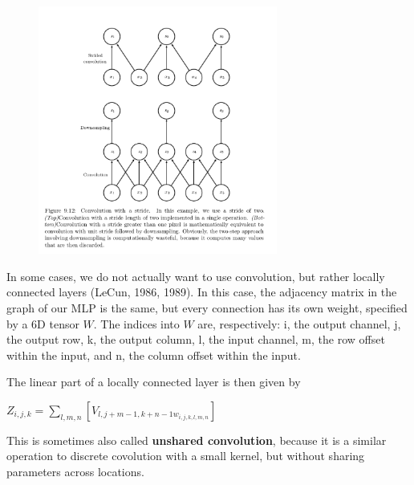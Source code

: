 \documentclass[onecolumn, letterpaper, 12pt]{report}
\begin{document}
\begin{figure}[h]
  \centering
  \includegraphics[width=0.7\textwidth]{strides.png}
\end{figure}

In some cases, we do not actually want to use convolution, but rather locally connected layers (LeCun, 1986, 1989). In this case, the adjacency matrix in the graph of our MLP is the same, but every connection has its own weight, specified by a 6D tensor $W$. The indices into $W$ are, respectively: i, the output channel, j, the output row, k, the output column, l, the input channel, m, the row offset within the input, and n, the column offset within the input. 

The linear part of a locally connected layer is then given by 

\begin{center}
  $Z_{i, j, k} = \sum\limits_{l, m, n}[V_{l,j+m-1,k+n-1w_{i,j,k,l,m,n}}]$
\end{center}

This is sometimes also called \textbf{unshared convolution}, because it is a similar operation to discrete covolution with a small kernel, but without sharing parameters across locations. 
\end{document}

